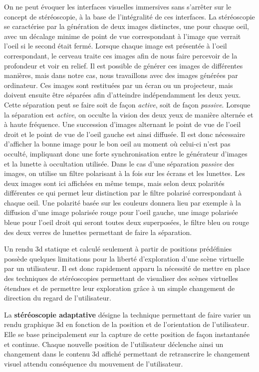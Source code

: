 On ne peut évoquer les interfaces visuelles immersives sans s'arrêter sur le concept de stéréoscopie, à la base de l'intégralité de ces interfaces. La stéréoscopie se caractérise par la génération de deux images distinctes, une pour chaque oeil, avec un décalage minime de point de vue correspondant à l'image que verrait l'oeil si le second était fermé. Lorsque chaque image est présentée à l'oeil correspondant, le cerveau traite ces images afin de nous faire percevoir de la profondeur et voir en relief. Il est possible de générer ces images de différentes manières, mais dans notre cas, nous travaillons avec des images générées par ordinateur. Ces images sont restituées par un écran ou un projecteur, mais doivent ensuite être séparées afin d'atteindre indépendamment les deux yeux. Cette séparation peut se faire soit de façon \textit{active}, soit de façon \textit{passive}. Lorsque la séparation est \textit{active}, on occulte la vision des deux yeux de manière alternée et à haute fréquence. Une succession d'images alternant le point de vue de l'oeil droit et le point de vue de l'oeil gauche est ainsi diffusée. Il est donc nécessaire d'afficher la bonne image pour le bon oeil au moment où celui-ci n'est pas occulté, impliquant donc une forte synchronisation entre le générateur d'images et la lunette à occultation utilisée.
Dans le cas d'une séparation \textit{passive} des images, on utilise un filtre polarisant à la fois sur les écrans et les lunettes. Les deux images sont ici affichées en même temps, mais selon deux polarités différentes ce qui permet leur distinction par le filtre polarisé correspondant à chaque oeil. Une polarité basée sur les couleurs donnera lieu par exemple à la diffusion d'une image polarisée rouge pour l'oeil gauche, une image polarisée bleue pour l'oeil droit qui seront toutes deux superposées, le filtre bleu ou rouge des deux verres de lunettes permettant de faire la séparation.

 \label{visu_adaptative}

Un rendu 3d statique et calculé seulement à partir de positions prédéfinies possède quelques limitations pour la liberté d'exploration d'une scène virtuelle par un utilisateur.
Il est donc rapidement apparu la nécessité de mettre en place des techniques de stéréoscopies permettant de visualiser des scènes virtuelles étendues et de permettre leur exploration grâce à un simple changement de direction du regard de l'utilisateur.

La \textbf{stéréoscopie adaptative} désigne la technique permettant de faire varier un rendu graphique 3d en fonction de la position et de l'orientation de l'utilisateur. Elle se base principalement sur la capture de cette position de façon instantanée et continue. Chaque nouvelle position de l'utilisateur déclenche ainsi un changement dans le contenu 3d affiché permettant de retranscrire le changement visuel attendu conséquence du mouvement de l'utilisateur.

